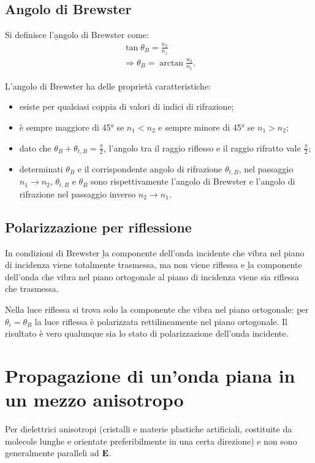 \subsection{Angolo di Brewster}
Si definisce l'\b{angolo di Brewster} come:
\begin{equation}\begin{split}
\tan{\theta_B}=\frac{n_2}{n_1}\\
\Longrightarrow \theta_B=\arctan{\frac{n_2}{n_1}}.
\end{split}\end{equation}

L'angolo di Brewster ha delle \b{proprietà caratteristiche}:
\begin{itemize}
\item esiste per qualsiasi coppia di valori di indici di rifrazione;
\item è sempre maggiore di \ang{45;;} se $n_1<n_2$ e sempre minore di \ang{45;;} se $n_1>n_2$;
\item dato che $\theta_B+\theta_{t,B}=\frac{\pi}{2}$, l'angolo tra il raggio riflesso e il raggio rifratto vale $\frac{\pi}{2}$;
\item determinati $\theta_B$ e il corrispondente angolo di rifrazione $\theta_{t,B}$, nel passaggio $n_1\to n_2$, $\theta_{t,B}$ e $\theta_B$ sono rispettivamente l'angolo di Brewster e l'angolo di rifrazione nel passaggio inverso $n_2\to n_1$.
\end{itemize}

\subsection{Polarizzazione per riflessione}
In condizioni di Brewster \b{la componente dell'onda incidente che vibra nel piano di incidenza viene totalmente trasmessa}, ma non viene riflessa e \b{la componente dell'onda che vibra nel piano ortogonale al piano di incidenza viene sia riflessa che trasmessa}.

Nella luce riflessa si trova solo la componente che vibra nel piano ortogonale: \b{per $\theta_i=\theta_B$ la luce riflessa è polarizzata rettilineamente nel piano ortogonale}. Il risultato è vero qualunque sia lo stato di polarizzazione dell'onda incidente.

\section{Propagazione di un'onda piana \elettrom in un mezzo anisotropo}%
Per dielettrici anisotropi (cristalli e materie plastiche artificiali, costituite da molecole lunghe e orientate preferibilmente in una certa direzione) \dP e \dD non sono generalmente paralleli ad $\mathbf{E}$.

